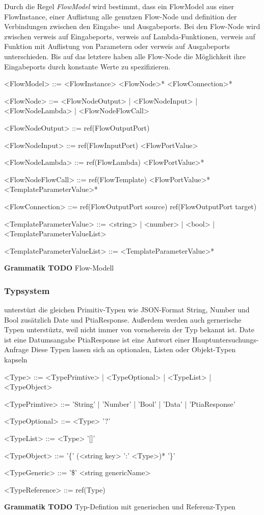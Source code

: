 \documentclass{article}
\begin{document}
    Durch die Regel \textit{FlowModel} wird bestimmt, dass ein FlowModel aus einer FlowInstance, einer Auflistung alle genutzen Flow-Node und definition der Verbindungen zwischen den Eingabe- und Ausgabeports.
    Bei den Flow-Node wird zwischen verweis auf Eingabeports, verweis auf Lambda-Funktionen, verweis auf Funktion mit Auflistung von Parametern oder verweis auf Ausgabeports unterschieden.
    Bis auf das letztere haben alle Flow-Node die Möglichkeit ihre Eingabeports durch konstante Werte zu spezifizieren.
    \begin{grammar}
        <FlowModel> ::= <FlowInstance> <FlowNode>* <FlowConnection>*

        <FlowNode> ::= <FlowNodeOutput> | <FlowNodeInput> | <FlowNodeLambda> | <FlowNodeFlowCall>
       
        <FlowNodeOutput> ::= ref(FlowOutputPort)

        <FlowNodeInput> ::= ref(FlowInputPort) <FlowPortValue>

        <FlowNodeLambda> ::= ref(FlowLambda) <FlowPortValue>*

        <FlowNodeFlowCall> ::= ref(FlowTemplate) <FlowPortValue>* <TemplateParameterValue>*
    
        <FlowConnection> ::= ref(FlowOutputPort source) ref(FlowOutputPort target)
    
        <TemplateParameterValue> ::= <string> | <number> | <bool> | <TemplateParameterValueList>
    
        <TemplateParameterValueList> ::= <TemplateParameterValue>*
    \end{grammar}
    \textbf{Grammatik TODO} Flow-Modell
    \subsubsection{Typsystem}
    unterstüzt die gleichen Primitiv-Typen wie JSON-Format String, Number und Bool zusätzlich Date und PtiaResponse. Außerdem werden auch gernerische Typen unterstüztz, weil nicht immer von vorneherein der Typ bekannt ist.
    Date ist eine Datumsangabe
    PtiaResponse ist eine Antwort einer Hauptuntersuchungs-Anfrage
    Diese Typen lassen sich an optionalen, Listen oder Objekt-Typen kapseln\\
    \begin{grammar}
        <Type> ::= <TypePrimtive> | <TypeOptional> | <TypeList> | <TypeObject>

        <TypePrimtive> ::= 'String' | 'Number' | 'Bool' | 'Data' | 'PtiaResponse'
        
        <TypeOptional> ::= <Type> '?'
        
        <TypeList> ::= <Type> '[]'
        
        <TypeObject> ::= '\{' (<string key> ':' <Type>)* '\}'

        <TypeGeneric> ::= '\$' <string genericName>

        <TypeReference> ::= ref(Type)
    \end{grammar}
    \textbf{Grammatik TODO} Typ-Defintion mit generischen und Referenz-Typen
\end{document}
